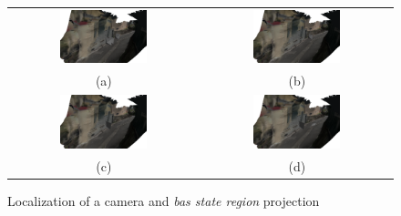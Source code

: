 \begin{figure}[t]
\centering
\setlength{\tabcolsep}{1px}
\begin{tabular}{cc}
\includegraphics[width=0.48\textwidth]{./img/ch-further/snapshot01}&
\includegraphics[width=0.48\textwidth]{./img/ch-further/02-bestImage02}\\
(a)&(b)\\
\includegraphics[width=0.48\textwidth]{./img/ch-further/03-localize07}&
\includegraphics[width=0.48\textwidth]{./img/ch-further/04-projection08}\\
(c)&(d)\\
\end{tabular}
\caption{Localization of a camera and \emph{bas state region} projection}
\label{fig:mep_localize}
\end{figure}



